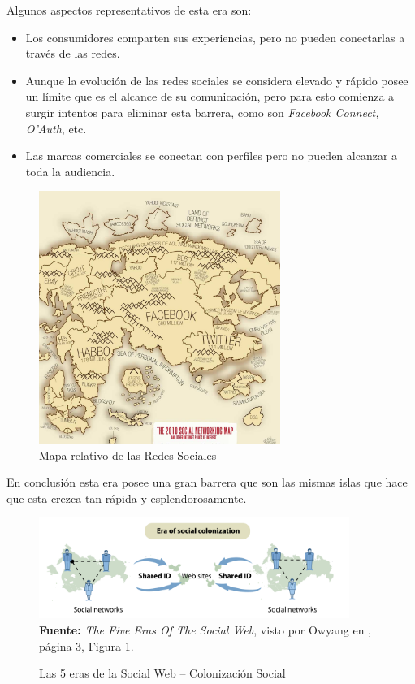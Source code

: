 \documentclass[oneside,12pt,a4paper]{memoir}%
\begin{document}
\begin{enumerate}
		  Algunos aspectos representativos de esta era son:
		
		  \begin{itemize}
		    \item Los consumidores comparten sus experiencias, pero no pueden
		    conectarlas a trav\'es de las redes.
		    \item Aunque la evoluci\'on de las redes sociales se considera elevado y
		    r\'apido posee un l\'imite que es el alcance de su comunicaci\'on, pero para
		    esto comienza a surgir intentos para eliminar esta barrera, como son
		    \textit{Facebook Connect, O'Auth}, etc.
		    \item Las marcas comerciales se conectan con perfiles pero no pueden
		    alcanzar a toda la audiencia.
		  \end{itemize}
		  
		  \begin{figure}[here]
			\centering
			\caption{Mapa relativo de las Redes Sociales}
			\includegraphics[width=0.7\textwidth]{figure/fig_SocialNetworkMap.png}
			
			\label{fig:SNMap}
		  \end{figure}
		
		  En conclusi\'on esta era posee una gran barrera que son las mismas islas que
		  hace que esta crezca tan r\'apida y esplendorosamente.
		    
		    
		  \begin{figure}[here]
			\centering
			\caption{Las 5 eras de la Social Web -- Colonizaci\'on Social}
			\includegraphics[width=0.9\textwidth]{figure/fig_5ErasC.png}
			\newline
			\textbf{Fuente:} \textit{The Five Eras Of The Social Web}, visto por Owyang
			en \cite{Forrester2009}, p\'agina 3, Figura 1.
			\label{fig:5ErasC}
		  \end{figure}
		

\end{enumerate}
\end{document}
